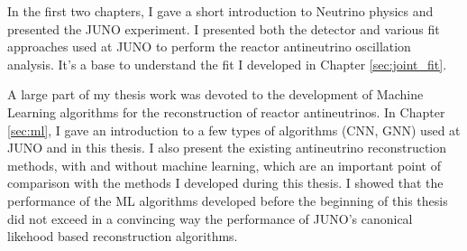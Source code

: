 \documentclass[../main.tex]{subfiles}
\begin{document}
\hfill

In the first two chapters, I gave a short introduction to Neutrino physics and presented the JUNO experiment. I presented both the detector and various fit approaches used at JUNO to perform the reactor antineutrino oscillation analysis. It's a base to understand the fit I developed in Chapter \ref{sec:joint_fit}.

A large part of my thesis work was devoted to the development of Machine Learning algorithms for the reconstruction of reactor antineutrinos. In Chapter \ref{sec:ml}, I gave an introduction to a few types of algorithms (CNN, GNN) used at JUNO and in this thesis. I also present the existing antineutrino reconstruction methods, with and without machine learning, which are an important point of comparison with the methods I developed during this thesis. I showed that the performance of the ML algorithms developed before the beginning of this thesis did not exceed in a convincing way the performance of JUNO's canonical likehood based reconstruction algorithms.


\hfill
\end{document}
